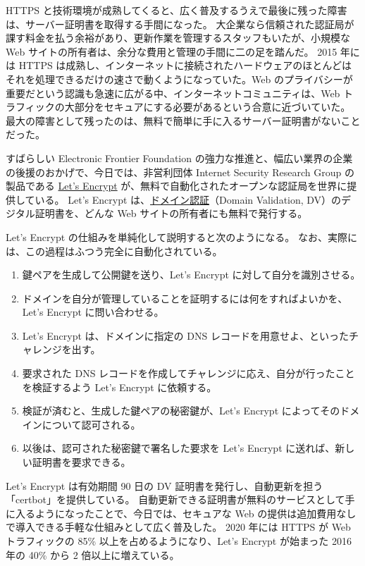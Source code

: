 \documentclass[uplatex]{jsarticle}
\def\label#1{}%
\begin{document}
HTTPS と技術環境が成熟してくると、広く普及するうえで最後に残った障害は、サーバー証明書を取得する手間になった。
大企業なら信頼された認証局が課す料金を払う余裕があり、更新作業を管理するスタッフもいたが、小規模な Web サイトの所有者は、余分な費用と管理の手間に二の足を踏んだ。
2015 年には HTTPS は成熟し、インターネットに接続されたハードウェアのほとんどはそれを処理できるだけの速さで動くようになっていた。Web のプライバシーが重要だという認識も急速に広がる中、インターネットコミュニティは、Web トラフィックの大部分をセキュアにする必要があるという合意に近づいていた。
最大の障害として残ったのは、無料で簡単に手に入るサーバー証明書がないことだった。

すばらしい Electronic Frontier Foundation の強力な推進と、幅広い業界の企業の後援のおかげで、今日では、非営利団体 Internet Security Research Group の製品である \underline{Let's Encrypt} が、無料で自動化されたオープンな認証局を世界に提供している。
Let's Encrypt は、\underline{ドメイン認証}（Domain Validation, DV）のデジタル証明書を、どんな Web サイトの所有者にも無料で発行する。

\begin{exa}\label{exa:ch11-lets-encrypt}
Let's Encrypt の仕組みを単純化して説明すると次のようになる。
なお、実際には、この過程はふつう完全に自動化されている。
\begin{enumerate}
\item 鍵ペアを生成して公開鍵を送り、Let's Encrypt に対して自分を識別させる。
\item ドメインを自分が管理していることを証明するには何をすればよいかを、Let's Encrypt に問い合わせる。
\item Let's Encrypt は、ドメインに指定の DNS レコードを用意せよ、といったチャレンジを出す。
\item 要求された DNS レコードを作成してチャレンジに応え、自分が行ったことを検証するよう Let's Encrypt に依頼する。
\item 検証が済むと、生成した鍵ペアの秘密鍵が、Let's Encrypt によってそのドメインについて認可される。
\item 以後は、認可された秘密鍵で署名した要求を Let's Encrypt に送れば、新しい証明書を要求できる。
\end{enumerate}
\end{exa}

Let's Encrypt は有効期間 90 日の DV 証明書を発行し、自動更新を担う「certbot」を提供している。
自動更新できる証明書が無料のサービスとして手に入るようになったことで、今日では、セキュアな Web の提供は追加費用なしで導入できる手軽な仕組みとして広く普及した。
2020 年には HTTPS が Web トラフィックの 85\% 以上を占めるようになり、Let's Encrypt が始まった 2016 年の 40\% から 2 倍以上に増えている。
\end{document}
